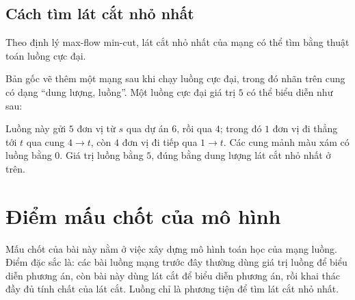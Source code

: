\documentclass[11pt]{article}
\begin{document}
\subsection{Cách tìm lát cắt nhỏ nhất}

Theo định lý max-flow min-cut, lát cắt nhỏ nhất của mạng có thể tìm bằng thuật
toán luồng cực đại.

Bản gốc vẽ thêm một mạng sau khi chạy luồng cực đại, trong đó nhãn trên cung
có dạng ``dung lượng, luồng''. Một luồng cực đại giá trị \(5\) có thể biểu
diễn như sau:

\begin{center}
\end{center}

Luồng này gửi \(5\) đơn vị từ \(s\) qua dự án \(6\), rồi qua \(4\); trong đó
\(1\) đơn vị đi thẳng tới \(t\) qua cung \(4\to t\), còn \(4\) đơn vị đi tiếp
qua \(1\to t\). Các cung mảnh màu xám có luồng bằng \(0\). Giá trị luồng bằng
\(5\), đúng bằng dung lượng lát cắt nhỏ nhất ở trên.

\section{Điểm mấu chốt của mô hình}

Mấu chốt của bài này nằm ở việc xây dựng mô hình toán học của mạng luồng. Điểm
đặc sắc là: các bài luồng mạng trước đây thường dùng giá trị luồng để biểu
diễn phương án, còn bài này dùng lát cắt để biểu diễn phương án, rồi khai thác
đầy đủ tính chất của lát cắt. Luồng chỉ là phương tiện để tìm lát cắt nhỏ
nhất.
\end{document}
